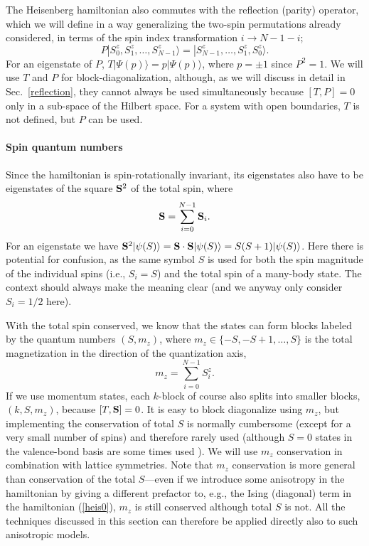 \documentclass[draft,numberedheadings]{aipproc}
\begin{document}
The Heisenberg hamiltonian also commutes with the reflection (parity) operator, which we will define in a way generalizing the two-spin permutations already 
considered, in terms of the spin index transformation $i \to N-1-i$;
\begin{equation}
P|S^z_0,S^z_1,\ldots,S^z_{N-1}\rangle=|S^z_{N-1},\ldots,S^z_1,S^z_{0}\rangle.
\label{pdef}
\end{equation}
For an eigenstate of $P$, $T|\Psi(p)\rangle = p|\Psi(p)\rangle$, where $p=\pm 1$ since $P^2=1$. We will use $T$ and $P$ for block-diagonalization, 
although, as we will discuss in detail in Sec.~\ref{reflection}, they cannot always be used simultaneously because $[T,P]=0$ only in a sub-space 
of the Hilbert space. For a system with open boundaries, $T$ is not defined, but $P$ can be used. 

\paragraph{Spin quantum numbers}

Since the hamiltonian is spin-rotationally invariant, its eigenstates also have to be eigenstates of the square 
${\bf S}^2$ of the total spin, where
\begin{equation}
{\bf S} = \sum_{i=0}^{N-1} {\bf S}_i.
\label{totals}
\end{equation}
For an eigenstate we have ${\bf S}^2|\psi(S)\rangle= {\bf S} \cdot {\bf S}|\psi(S)\rangle =S(S+1)|\psi(S)\rangle$. Here there is potential for confusion, as 
the same symbol $S$ is used for both the spin magnitude of the individual spins (i.e., $S_i=S$) and the total spin of a many-body state. The context 
should always make the meaning clear (and we anyway only consider $S_i=1/2$ here). 

With the total spin conserved, we know that the states can form blocks labeled by the quantum numbers $(S,m_z)$, where $m_z \in \{-S,-S+1,\ldots,S\}$ is the 
total magnetization in the direction of the quantization axis,
\begin{equation}
m_z=\sum_{i=0}^{N-1} S^z_i.
\end{equation}
If we use momentum states, each $k$-block of course also splits into smaller blocks, $(k,S,m_z)$, because $[T,{\bf S}]=0$. 
It is easy to block diagonalize using $m_z$, but implementing the conservation of total $S$ is normally cumbersome (except for a very small number of spins) 
and therefore rarely used (although $S=0$ states in the valence-bond basis are some times used \cite{poilblanc}).
We will use $m_z$ conservation in combination with lattice symmetries. Note that $m_z$ conservation is more general than conservation
of the total $S$---even if we introduce some anisotropy in the hamiltonian by giving a different prefactor to, e.g., the Ising (diagonal) term in the
hamiltonian (\ref{heis0}), $m_z$ is still conserved although total $S$ is not. All the techniques discussed in this section can therefore be applied
directly also to such anisotropic models.
\end{document}

